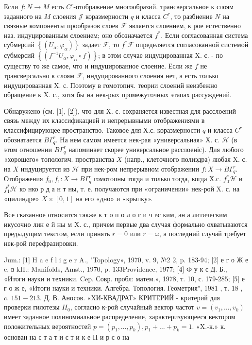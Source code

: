 \documentclass[10pt]{article}
\begin{document}
Если $f: N \longrightarrow M$ есть $C^{r}$-отображение многообразий. трансверсальное к слоям заданного на $M$ слоения $\mathscr{J}$ коразмерности $q$ и класса $C^{r}$, то разбиение $N$ на связные компоненты прообразов слоев $\mathscr{\mathcal { F }}$ является слоением, к рое естественно наз. индуцированным слоением; оно обозначается $f^{*}$. Если согласованная система субмерсий $\left\{\left(U_{\alpha}, \varphi_{\alpha}\right)\right\}$ задает $\mathscr{F}$, то $f^{*} \mathscr{F}$ определяется согласованной системой субмерсий $\left\{\left(f^{-1} U_{\alpha}, \varphi_{\alpha} \circ f\right)\right\}$; в этом случае индуцированная X. с. - по существу то же самое, что и индуцированное слоение. Если же $f$ не трансверсально к слоям $\mathscr{F}$, индуцированного слоения нет, а есть только индуцированная X. с. Поэтому в гомотопич. теории слоений неизбежно обращение к X. с., хотя бы на нек-рых промежуточных этапах рассуждений.



Обнаружено (см. [1], [2]), что для X. с. сохраняется известная для расслоений связь между их классификацией и непрерывными отображениями в классифицируюцее пространство.-Таковое для Х.с. коразмерности $q$ и класса $C^{r}$ обознатается $B \Gamma_{q}^{r}$. На нем самом имеется нек-рая «универсальная» Х. с. $\mathscr{H}$ (в этом отношении $B \Gamma_{q}^{r}$ напоминает скорее универсальное расслоеніс). Для любого «хорошего» топологич. пространства $X$ (напр., клеточного полиэдра) любая X. с. на $X$ индуцируется из $\mathscr{H}$ при нек-ром непрерывном отображении $f: X \longrightarrow B \Gamma_{q}^{r}$. Отображения $f_{0}, f_{1}: X \longrightarrow B \Gamma_{q}^{r}$ гомотопны тогда и только тогда, когда Х.с. $f_{0}^{*} \mathscr{H}$ и $f_{1}^{*} \mathscr{H}$ ко нко р д а н т ны, т. е. получаются при «ограничении» нек-рой $\mathrm{X}$. с. на «цилиндре» $X \times[0,1]$ на его «дно» и «крыпку».



Все сказанное относится также к т о п о л о г и ч eс ким, ан а литическим икусочно лин е й ны м X. с., причем первые два случая формально охватываются предыдущим текстом, если принять $r=0$ или $r=\omega$, а последний случай требует нек-рой перефразировки.



Jum.: [1] H a e f l i g e r A., "Topology», 1970, v. 9, №2 2, p. 183-94; [2] е г о Ж е e, в kH.: Manifolds, Amst., 1970, p. 133Providence, 1977; [4] Ф у к с Д. Б., «Итоги науки и техники. Cep. Совр. пробл: матем.», 1978, т. 10, с. 179-285; [5] е г о ж е, «Итоги науки и техники. Алгебра. Топология. Геометрия", 1981 , т. 18 , c. $151-213$. Д. В. Аносов. «ХИ-КВАДРАТ» КРИТЕРИЙ - критерий для проверки гилотезы $H_{0}$, согласно к-рой случайный вектор частот $v=\left(v_{1}, \ldots, v_{k}\right)$ имеет заданное полиномиальное распределение, характеризующееся вектором положительных вероятностей $p=\left(p_{1}, \ldots, p_{k}\right), p_{1}+\ldots+p_{k}=1$. «X.-к.» к. основан на с т а т и с т и к е II и р с о на
\end{document}
